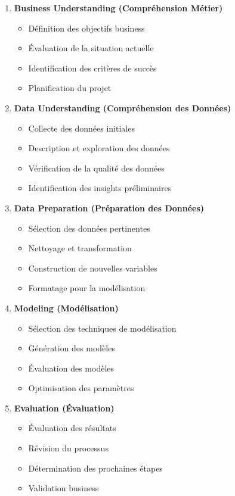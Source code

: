 \begin{enumerate}
    \item \textbf{Business Understanding (Compréhension Métier)}
    \begin{itemize}
        \item Définition des objectifs business
        \item Évaluation de la situation actuelle
        \item Identification des critères de succès
        \item Planification du projet
    \end{itemize}
    
    \item \textbf{Data Understanding (Compréhension des Données)}
    \begin{itemize}
        \item Collecte des données initiales
        \item Description et exploration des données
        \item Vérification de la qualité des données
        \item Identification des insights préliminaires
    \end{itemize}
    
    \item \textbf{Data Preparation (Préparation des Données)}
    \begin{itemize}
        \item Sélection des données pertinentes
        \item Nettoyage et transformation
        \item Construction de nouvelles variables
        \item Formatage pour la modélisation
    \end{itemize}
    
    \item \textbf{Modeling (Modélisation)}
    \begin{itemize}
        \item Sélection des techniques de modélisation
        \item Génération des modèles
        \item Évaluation des modèles
        \item Optimisation des paramètres
    \end{itemize}
    
    \item \textbf{Evaluation (Évaluation)}
    \begin{itemize}
        \item Évaluation des résultats
        \item Révision du processus
        \item Détermination des prochaines étapes
        \item Validation business
    \end{itemize}
    

\end{enumerate}
